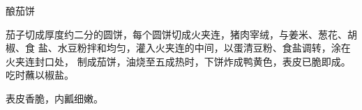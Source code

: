 \begin{recipe}{酿茄饼}

\ingredients


\preparation

茄子切成厚度约二分的圆饼，每个圆饼切成火夹连，猪肉宰绒，与姜米、葱花、胡椒、食
盐、水豆粉拌和均匀，灌入火夹连的中间，以蛋清豆粉、食盐调转，涂在火夹连封口处，
制成茄饼，油烧至五成热时，下饼炸成鸭黄色，表皮已脆即成。吃时蘸以椒盐。

\features

表皮香脆，内瓤细嫩。

\end{recipe}

